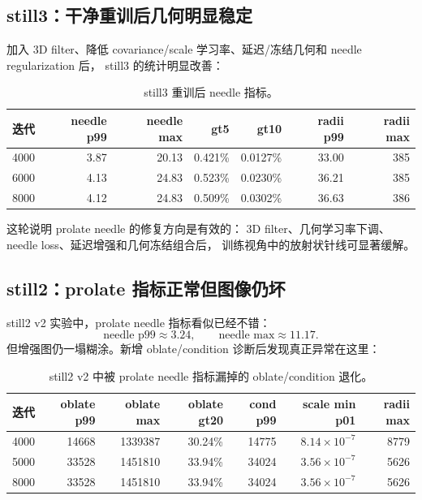 \documentclass[11pt,a4paper]{article}
\begin{document}
\subsection{still3：干净重训后几何明显稳定}

加入 3D filter、降低 covariance/scale 学习率、延迟/冻结几何和 needle regularization 后，
still3 的统计明显改善：

\begin{table}[h]
\centering
\begin{tabular}{lrrrrrr}
\toprule
迭代 & needle p99 & needle max & gt5 & gt10 & radii p99 & radii max \\
\midrule
4000 & 3.87 & 20.13 & 0.421\% & 0.0127\% & 33.00 & 385 \\
6000 & 4.13 & 24.83 & 0.523\% & 0.0230\% & 36.21 & 385 \\
8000 & 4.12 & 24.83 & 0.509\% & 0.0302\% & 36.63 & 386 \\
\bottomrule
\end{tabular}
\caption{still3 重训后 needle 指标。}
\end{table}

这轮说明 prolate needle 的修复方向是有效的：
3D filter、几何学习率下调、needle loss、延迟增强和几何冻结组合后，
训练视角中的放射状针线可显著缓解。

\subsection{still2：prolate 指标正常但图像仍坏}

still2 v2 实验中，prolate needle 指标看似已经不错：
\[
  \text{needle p99} \approx 3.24, \qquad
  \text{needle max} \approx 11.17 .
\]
但增强图仍一塌糊涂。新增 oblate/condition 诊断后发现真正异常在这里：

\begin{table}[h]
\centering
\begin{tabular}{lrrrrrr}
\toprule
迭代 & oblate p99 & oblate max & oblate gt20 & cond p99 & scale min p01 & radii max \\
\midrule
4000 & 14668 & 1339387 & 30.24\% & 14775 & \(8.14\times10^{-7}\) & 8779 \\
5000 & 33528 & 1451810 & 33.94\% & 34024 & \(3.56\times10^{-7}\) & 5626 \\
8000 & 33528 & 1451810 & 33.94\% & 34024 & \(3.56\times10^{-7}\) & 5626 \\
\bottomrule
\end{tabular}
\caption{still2 v2 中被 prolate needle 指标漏掉的 oblate/condition 退化。}
\end{table}
\end{document}
